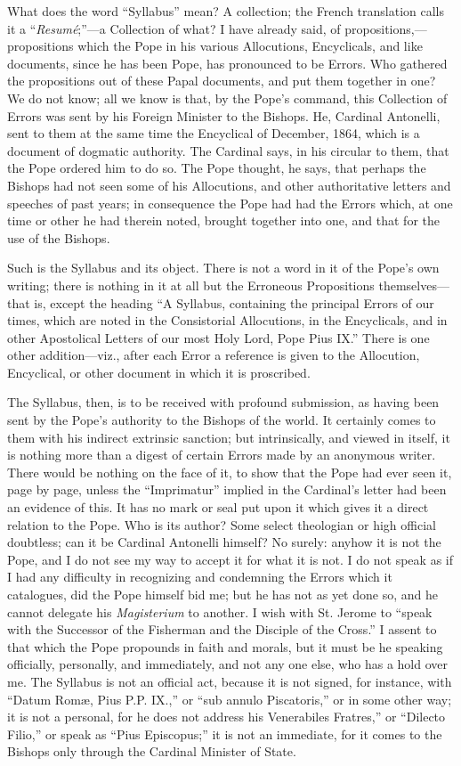 What does the word ``Syllabus'' mean? A collection; the
French translation calls it a ``\emph{Resumé};''—a Collection of
what? I have already said, of propositions,—propositions which the
Pope in his various Allocutions, Encyclicals, and like documents, since
he has been Pope, has pronounced to be Errors. Who gathered the
propositions out of these Papal documents, and put them together in one?
We do not know; all we know is that, by the Pope's command, this
Collection of Errors was sent by his Foreign Minister to the Bishops.
He, Cardinal Antonelli, sent to them at the same time the
Encyclical of December, 1864, which is a document of dogmatic authority.
The Cardinal says, in his circular to them, that the Pope ordered him to
do so. The Pope thought, he says, that perhaps the Bishops had not seen
some of his Allocutions, and other authoritative letters and speeches of
past years; in consequence the Pope had had the Errors which, at one
time or other he had therein noted, brought together into one, and that
for the use of the Bishops.

Such is the Syllabus and its object. There is not a word in it of the
Pope's own writing; there is nothing in it at all but the Erroneous
Propositions themselves—that is, except the heading ``A Syllabus,
containing the principal Errors of our times, which are noted in the
Consistorial Allocutions, in the Encyclicals, and in other Apostolical
Letters of our most Holy Lord, Pope Pius IX.'' There is one other
addition—viz., after each Error a reference is given to the
Allocution, Encyclical, or other document in which it is proscribed.

The Syllabus, then, is to be received with profound submission, as
having been sent by the Pope's authority to the Bishops of the world. It
certainly comes to them with his indirect extrinsic sanction; but
intrinsically, and viewed in itself, it is nothing more than a digest of
certain Errors made by an anonymous writer. There would be nothing on
the face of it, to show that the Pope had ever seen it, page by page,
unless the ``Imprimatur'' implied in the Cardinal's letter had
been an evidence of this. It has no mark or seal put upon it which gives
it a direct relation to the Pope. Who is its author? Some select
theologian or high official doubtless; can it be Cardinal Antonelli
himself? No surely: anyhow it is not the Pope, and I do not see my way
to accept it for what it is not. I do not speak as if I had any
difficulty in recognizing and condemning the Errors which it catalogues,
did the Pope himself bid me; but he has not as yet done so, and he
cannot delegate his \emph{Magisterium} to another. I wish with St.
Jerome to ``speak with the Successor of the Fisherman and the
Disciple of the Cross.'' I assent to that which the Pope propounds
in faith and morals, but it must be he speaking officially, personally,
and immediately, and not any one else, who has a hold over me. The
Syllabus is not an official act, because it is not signed, for instance,
with ``Datum Romæ, Pius P.P. IX.,'' or ``sub annulo
Piscatoris,'' or in some other way; it is not a personal, for he
does not address his Venerabiles Fratres,'' or ``Dilecto Filio,''
or speak as ``Pius Episcopus;'' it is not an immediate, for it
comes to the Bishops only through the Cardinal Minister of State.

